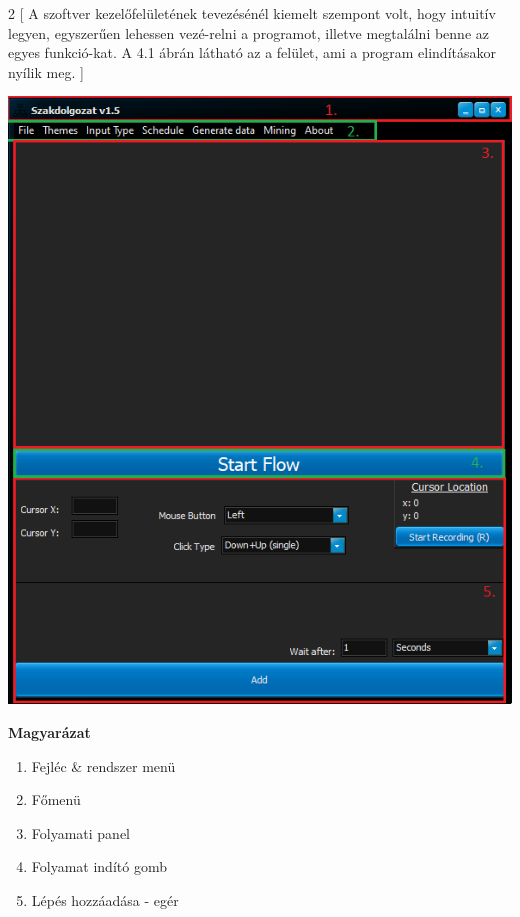 
\begin{multicols}{2}
[
A szoftver kezelőfelületének tevezésénél kiemelt szempont volt, hogy intuitív legyen, egyszerűen lehessen vezé\hyp{}relni a programot, illetve megtalálni benne az egyes funkció\hyp{}kat. A 4.1 ábrán látható az a felület, ami a program elindításakor nyílik meg.
]
	
	\begin{Figure}
		\centering		
		\includegraphics[width=\linewidth, keepaspectratio=true]{images/img_ui_1}	
		\label{fig:ui}
	\end{Figure}
	
	\textbf{Magyarázat}
	\begin{enumerate}
		\item{Fejléc \& rendszer menü}
		\item{Főmenü}
		\item{Folyamati panel}
		\item{Folyamat indító gomb}
		\item{Lépés hozzáadása - egér}
	\end{enumerate}

\end{multicols}

